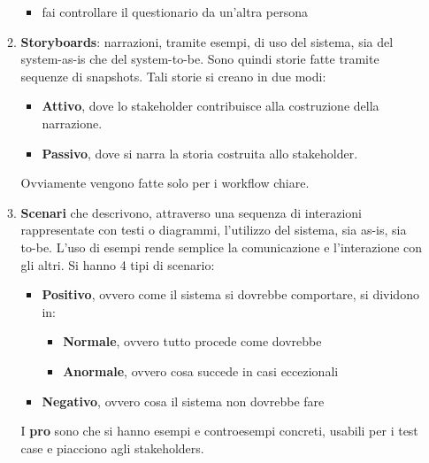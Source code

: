 \begin{itemize}
\begin{enumerate}
\begin{itemize}
                              \item fai controllare il questionario da un'altra persona
                        \end{itemize}
                  \item \textbf{Storyboards}: narrazioni, tramite esempi, di uso del sistema,
                        sia del system-as-is che del system-to-be. Sono quindi storie fatte tramite
                        sequenze di snapshots. Tali storie si creano in due modi:
                        \begin{itemize}
                              \item \textbf{Attivo}, dove lo stakeholder contribuisce alla costruzione
                                    della narrazione.
                              \item \textbf{Passivo}, dove si narra la storia costruita allo
                                    stakeholder.
                        \end{itemize}
                        Ovviamente vengono fatte solo per i workflow chiare.
                  \item \textbf{Scenari} che descrivono, attraverso una sequenza di interazioni
                        rappresentate con testi o diagrammi, l'utilizzo del sistema, sia as-is, sia
                        to-be. L'uso di esempi rende semplice la comunicazione e l'interazione con
                        gli altri. Si hanno 4 tipi di scenario:
                        \begin{itemize}
                              \item \textbf{Positivo}, ovvero come il sistema si dovrebbe comportare,
                                    si dividono in:
                                    \begin{itemize}
                                          \item \textbf{Normale}, ovvero tutto procede come dovrebbe
                                          \item \textbf{Anormale}, ovvero cosa succede in casi eccezionali
                                    \end{itemize}
                              \item \textbf{Negativo}, ovvero cosa il sistema non dovrebbe fare
                        \end{itemize}
                        I \textbf{pro} sono che si hanno esempi e controesempi 
                        concreti, usabili per i test case e piacciono agli stakeholders.


\end{enumerate}
\end{itemize}
